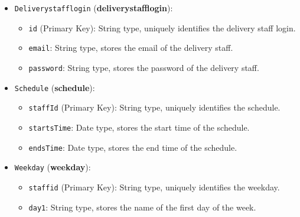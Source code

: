 \begin{itemize}
    \item \texttt{Deliverystafflogin} (\textbf{deliverystafflogin}):
    \begin{itemize}
        \item \texttt{id} (Primary Key): String type, uniquely identifies the delivery staff login.
        \item \texttt{email}: String type, stores the email of the delivery staff.
        \item \texttt{password}: String type, stores the password of the delivery staff.
    \end{itemize}
    \item \texttt{Schedule} (\textbf{schedule}):
    \begin{itemize}
        \item \texttt{staffId} (Primary Key): String type, uniquely identifies the schedule.
        \item \texttt{startsTime}: Date type, stores the start time of the schedule.
        \item \texttt{endsTime}: Date type, stores the end time of the schedule.
    \end{itemize}
    \item \texttt{Weekday} (\textbf{weekday}):
    \begin{itemize}
        \item \texttt{staffid} (Primary Key): String type, uniquely identifies the weekday.
        \item \texttt{day1}: String type, stores the name of the first day of the week.

\end{itemize}
\end{itemize}
